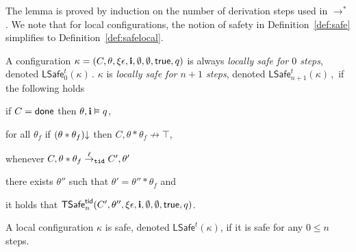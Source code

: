 \begin{sketch}
The lemma is proved by induction on the number of derivation steps used in $\rightarrow^*$.
We note that for local configurations, the notion of safety in Definition~\ref{def:safe} simplifies to Definition~\ref{def:safelocal}. 
\end{sketch}

\newcommand{\lsafe}[1][t]{\mathsf{LSafe}^{#1}}

\begin{defin}\label{def:safelocal}
  A configuration  $\kappa = (C,\theta,\xi\epsilon,{\bf i},\emptyset,\emptyset,\mathsf{true}, q)$ 
  is always \emph{locally safe for $0$ steps}, denoted 
  $
   \lsafe_0(\kappa)\,.
  $
  $\kappa$ is \emph{locally safe for $n + 1$ steps},  
  denoted 
  $
   \lsafe_{n+1}(\kappa)\,,
  $
  if the following  holds
  \begin{compactenum}[(a)]
    \item \label{safeloc:done} if 
     $C = {\sf done}$ then $\theta,{\bf i} \vDash q$,
     
    \item \label{safeloc:noabort}  
     for all $\theta_f$ if $(\theta*\theta_f)\mathpunct{\downarrow}$ then 
     $C,\theta*\theta_f \not\rightarrow \top$,  
     
    \item \label{safeloc:step} whenever $C,\theta*\theta_f \stackrel{\ell}{\rightarrow}_{\texttt{tid}} C',\theta'$ 
     \begin{compactenum}[(1)] 
        \item 
        \label{safeloc:step:frame}
    there exists  $\theta''$ such that $\theta'=\theta''*\theta_f$ and       
        \item 
        \label{safeloc:step:ind}
        it holds that  ${\sf TSafe}^{{\sf tid}}_{n}(C',\theta'',\xi\epsilon,{\bf i},\emptyset,\emptyset,\mathsf{true},q)$.       
     \end{compactenum}
  \end{compactenum}
  A local configuration $\kappa$ is safe, denoted $\lsafe(\kappa)$, if it is safe for any $0 \leq n$ steps.
\end{defin}


